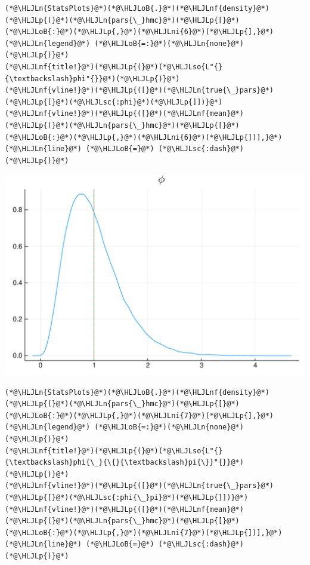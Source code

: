 \documentclass[12pt,a4paper]{article}
\newcommand{\HLJLn}[1]{#1}
\newcommand{\HLJLnf}[1]{\textcolor[RGB]{66,102,213}{#1}}
\newcommand{\HLJLsc}[1]{\textcolor[RGB]{201,61,57}{#1}}
\newcommand{\HLJLso}[1]{\textcolor[RGB]{201,61,57}{#1}}
\newcommand{\HLJLni}[1]{\textcolor[RGB]{59,151,46}{#1}}
\newcommand{\HLJLoB}[1]{\textcolor[RGB]{102,102,102}{\textbf{#1}}}
\newcommand{\HLJLp}[1]{#1}
\begin{document}
\begin{lstlisting}
(*@\HLJLn{StatsPlots}@*)(*@\HLJLoB{.}@*)(*@\HLJLnf{density}@*)(*@\HLJLp{(}@*)(*@\HLJLn{pars{\_}hmc}@*)(*@\HLJLp{[}@*)(*@\HLJLoB{:}@*)(*@\HLJLp{,}@*)(*@\HLJLni{6}@*)(*@\HLJLp{],}@*) (*@\HLJLn{legend}@*) (*@\HLJLoB{=:}@*)(*@\HLJLn{none}@*)(*@\HLJLp{)}@*)
(*@\HLJLnf{title!}@*)(*@\HLJLp{(}@*)(*@\HLJLso{L"{}{\textbackslash}phi"{}}@*)(*@\HLJLp{)}@*)
(*@\HLJLnf{vline!}@*)(*@\HLJLp{([}@*)(*@\HLJLn{true{\_}pars}@*)(*@\HLJLp{[}@*)(*@\HLJLsc{:phi}@*)(*@\HLJLp{]])}@*)
(*@\HLJLnf{vline!}@*)(*@\HLJLp{([}@*)(*@\HLJLnf{mean}@*)(*@\HLJLp{(}@*)(*@\HLJLn{pars{\_}hmc}@*)(*@\HLJLp{[}@*)(*@\HLJLoB{:}@*)(*@\HLJLp{,}@*)(*@\HLJLni{6}@*)(*@\HLJLp{])],}@*) (*@\HLJLn{line}@*) (*@\HLJLoB{=}@*) (*@\HLJLsc{:dash}@*)(*@\HLJLp{)}@*)
\end{lstlisting}

\includegraphics[width=\linewidth]{figures/dsge_and_julia_40_1.pdf}

\begin{lstlisting}
(*@\HLJLn{StatsPlots}@*)(*@\HLJLoB{.}@*)(*@\HLJLnf{density}@*)(*@\HLJLp{(}@*)(*@\HLJLn{pars{\_}hmc}@*)(*@\HLJLp{[}@*)(*@\HLJLoB{:}@*)(*@\HLJLp{,}@*)(*@\HLJLni{7}@*)(*@\HLJLp{],}@*) (*@\HLJLn{legend}@*) (*@\HLJLoB{=:}@*)(*@\HLJLn{none}@*)(*@\HLJLp{)}@*)
(*@\HLJLnf{title!}@*)(*@\HLJLp{(}@*)(*@\HLJLso{L"{}{\textbackslash}phi{\_}{\{}{\textbackslash}pi{\}}"{}}@*)(*@\HLJLp{)}@*)
(*@\HLJLnf{vline!}@*)(*@\HLJLp{([}@*)(*@\HLJLn{true{\_}pars}@*)(*@\HLJLp{[}@*)(*@\HLJLsc{:phi{\_}pi}@*)(*@\HLJLp{]])}@*)
(*@\HLJLnf{vline!}@*)(*@\HLJLp{([}@*)(*@\HLJLnf{mean}@*)(*@\HLJLp{(}@*)(*@\HLJLn{pars{\_}hmc}@*)(*@\HLJLp{[}@*)(*@\HLJLoB{:}@*)(*@\HLJLp{,}@*)(*@\HLJLni{7}@*)(*@\HLJLp{])],}@*) (*@\HLJLn{line}@*) (*@\HLJLoB{=}@*) (*@\HLJLsc{:dash}@*)(*@\HLJLp{)}@*)
\end{lstlisting}
\end{document}
